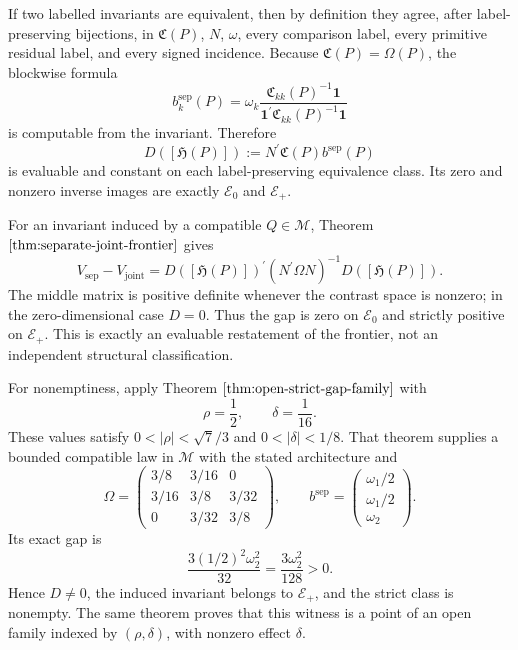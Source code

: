 If two labelled invariants are equivalent, then by definition they agree, after label-preserving bijections, in \(\mathfrak C(P)\), \(N\), \(\omega\), every comparison label, every primitive residual label, and every signed incidence. Because \(\mathfrak C(P)=\Omega(P)\), the blockwise formula
\[
 b_k^{\mathrm{sep}}(P)
 =\omega_k\frac{\mathfrak C_{kk}(P)^{-1}\mathbf 1}
 {\mathbf 1^{\prime}\mathfrak C_{kk}(P)^{-1}\mathbf 1}
\]
is computable from the invariant. Therefore
\[
 D([\mathfrak H(P)])
 :=N^{\prime}\mathfrak C(P)b^{\mathrm{sep}}(P)
\]
is evaluable and constant on each label-preserving equivalence class. Its zero and nonzero inverse images are exactly \(\mathscr E_0\) and \(\mathscr E_+\).

For an invariant induced by a compatible \(Q\in\mathcal M\), Theorem \(\ref{thm:separate-joint-frontier}\) gives
\[
 V_{\mathrm{sep}}-V_{\mathrm{joint}}
 =D([\mathfrak H(P)])^{\prime}
  (N^{\prime}\Omega N)^{-1}
  D([\mathfrak H(P)]).
\]
The middle matrix is positive definite whenever the contrast space is nonzero; in the zero-dimensional case \(D=0\). Thus the gap is zero on \(\mathscr E_0\) and strictly positive on \(\mathscr E_+\). This is exactly an evaluable restatement of the frontier, not an independent structural classification.

For nonemptiness, apply Theorem \(\ref{thm:open-strict-gap-family}\) with
\[
 \rho=\frac12,
 \qquad
 \delta=\frac1{16}.
\]
These values satisfy \(0<|\rho|<\sqrt7/3\) and \(0<|\delta|<1/8\). That theorem supplies a bounded compatible law in \(\mathcal M\) with the stated architecture and
\[
 \Omega=
 \begin{pmatrix}
 3/8&3/16&0\\
 3/16&3/8&3/32\\
 0&3/32&3/8
 \end{pmatrix},
 \qquad
 b^{\mathrm{sep}}=
 \begin{pmatrix}\omega_1/2\\ \omega_1/2\\ \omega_2\end{pmatrix}.
\]
Its exact gap is
\[
 \frac{3(1/2)^2\omega_2^2}{32}
 =\frac{3\omega_2^2}{128}>0.
\]
Hence \(D\ne0\), the induced invariant belongs to \(\mathscr E_+\), and the strict class is nonempty. The same theorem proves that this witness is a point of an open family indexed by \((\rho,\delta)\), with nonzero effect \(\delta\).